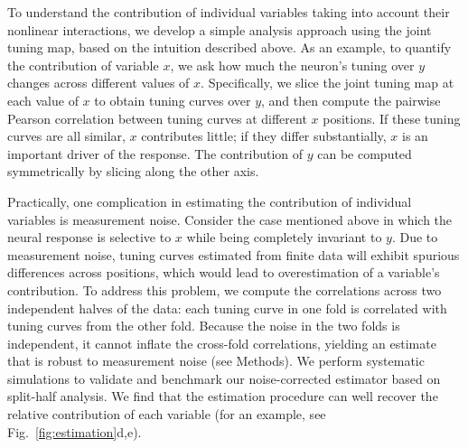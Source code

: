 \documentclass[11pt]{article}
\begin{document}
To understand the contribution of individual variables taking into account their nonlinear interactions, we develop a simple analysis approach using the joint tuning map, based on the intuition described above. As an example, to quantify the contribution of variable $x$, we ask how much the neuron's tuning over $y$ changes across different values of $x$. Specifically, we slice the joint tuning map at each value of $x$ to obtain tuning curves over $y$, and then compute the pairwise Pearson correlation between tuning curves at different $x$ positions. If these tuning curves are all similar, $x$ contributes little; if they differ substantially, $x$ is an important driver of the response. The contribution of $y$ can be computed symmetrically by slicing along the other axis. %

Practically, one complication in estimating the contribution of individual variables is measurement noise. Consider the case mentioned above in which the neural response is selective to $x$ while being completely invariant to $y$. Due to measurement noise, tuning curves estimated from finite data will exhibit spurious differences across positions, which would lead to overestimation of a variable's contribution. To address this problem, we compute the correlations across two independent halves of the data: each tuning curve in one fold is correlated with tuning curves from the other fold. Because the noise in the two folds is independent, it cannot inflate the cross-fold correlations, yielding an estimate that is robust to measurement noise (see Methods).
We perform systematic simulations to validate and benchmark our noise-corrected estimator based on split-half analysis. We find that the estimation procedure can well recover the relative contribution of each variable (for an example, see Fig.~\ref{fig:estimation}d,e). %

\end{document}
